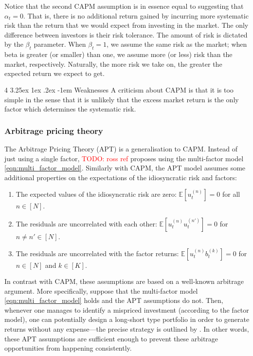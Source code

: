 \documentclass[12pt]{article}
\makeatletter
\renewcommand\paragraph{%
	\@startsection{paragraph}
	{4}
	{\z@}
	{3.25ex \@plus1ex \@minus.2ex}
	{-1em}
	{\normalfont\normalsize\bfseries\maybe@addperiod}%
}
\newcommand{\maybe@addperiod}[1]{%
	#1\@addpunct{.}%
}
\makeatother
\begin{document}
Notice that the second CAPM assumption is in essence equal to suggesting that $\alpha_t = 0$. That is, there is no additional return gained by incurring more systematic risk than the return that we would expect from investing in the market. The only difference between investors is their risk tolerance. The amount of risk is dictated by the $\beta_t$ parameter. When $\beta_t=1$, we assume the same risk as the market; when beta is greater (or smaller) than one, we assume more (or less) risk than the market, respectively. Naturally, the more risk we take on, the greater the expected return we expect to get.

\paragraph{Weaknesses} A criticism about CAPM is that it is too simple in the sense that it is unlikely that the excess market return is the only factor which determines the systematic risk.
\subsubsection{Arbitrage pricing theory}
The Arbitrage Pricing Theory (APT) is a generalisation to CAPM. Instead of just using a single factor, \textcolor{red}{TODO: ross ref} proposes using the multi-factor model \eqref{eqn:multi_factor_model}. Similarly with CAPM, the APT model assumes some additional properties on the expectations of the idiosyncratic risk and factors: 
\begin{enumerate}
	\item The expected values of the idiosyncratic risk are zero: $\mathbb{E}[u_t^{(n)}] = 0$ for all $n \in [N]$.
	\item  The residuals are uncorrelated with each other: $\mathbb{E}[u^{(n)}_t u^{(n')}_t] = 0$ for $n \neq n' \in [N]$.
	\item  The residuals are uncorrelated with the factor returns: $\mathbb{E}[u^{(n)}_t b^{(k)}_t] = 0$ for $n \in [N]$ and $k \in [K]$.
\end{enumerate}
In contrast with CAPM, these assumptions are based on a well-known arbitrage argument. More specifically, suppose that the multi-factor model \eqref{eqn:multi_factor_model} holds and the APT assumptions do not. Then, whenever one manages to identify a mispriced investment (according to the factor model), one can potentially design a long-short type portfolio in order to generate returns without any expense---the precise strategy is outlined by \citet[Chapter 7]{grinold1999}. In other words, these APT assumptions are sufficient enough to prevent these arbitrage opportunities from happening consistently.
\end{document}

